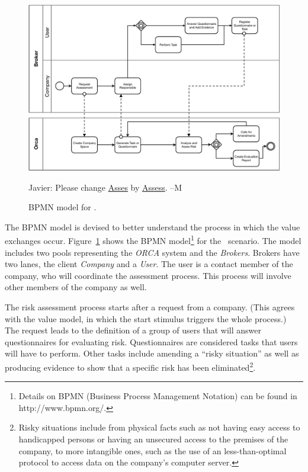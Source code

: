 \begin{figure}[t]
\centering
\includegraphics[width=1.0\textwidth]{figs/BPMN_GCP.pdf}

{\color{red} Javier: Please change \underline{Asses} by \underline{Assess}. --M}
\caption{BPMN model for \FlyingPig.\label{fig:BPMNmodel}}
\end{figure}

The BPMN model is devised to better understand the process in which the value exchanges occur.
Figure~\ref{fig:BPMNmodel} shows the BPMN model\footnote{Details on BPMN (Business Process Management Notation) can be found in http://www.bpmn.org/.} for the \FlyingPig\ scenario. 
The model includes two pools representing the \textsl{ORCA} system and the \textsl{Brokers}. 
Brokers have two lanes, the client \textsl{Company} and a \textsl{User}. 
The user is a contact member of the company, who will coordinate the assessment process. 
This process will involve other members of the company as well.

The risk assessment process starts after a request from a company.
(This agrees with the value model, in which the start stimulus triggers the whole process.)
The request leads to the definition of a group of users that will answer questionnaires for evaluating risk.
Questionnaires are considered tasks that users will have to perform. 
Other tasks include amending a ``risky situation'' as well as producing evidence to show that a specific risk has been eliminated\footnote{Risky situations include from physical facts such as not having easy access to handicapped persons or having an unsecured access to the premises of the company, to more intangible ones, such as the use of an less-than-optimal protocol to access data on the company's computer server.}.

